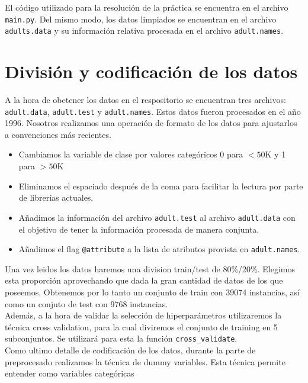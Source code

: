 \documentclass[11pt,a4paper]{article}
\begin{document}
El código utilizado para la resolución de la práctica se encuentra en el archivo \texttt{main.py}.  Del mismo modo, los datos limpiados se encuentran en el archivo \texttt{adults.data} y su información relativa procesada en el archivo \texttt{adult.names}.


\section{ División y codificación de los datos}

A la hora de obetener los datos en el respositorio se encuentran tres archivos: \texttt{adult.data},  \texttt{adult.test} y \texttt{adult.names}. Estos datos fueron procesados en el año 1996. Nosotros realizamos una operación de formato de los datos para ajustarlos a convenciones más recientes.

\begin{itemize}
\item Cambiamos la variable de clase por valores categóricos 0 para $<50$K y 1 para $>50$K
\item Eliminamos el espaciado después de la coma para facilitar la lectura por parte de librerías actuales.
\item Añadimos la información del archivo \texttt{adult.test} al archivo \texttt{adult.data} con el objetivo de tener la información procesada de manera conjunta.
\item Añadimos el flag \texttt{@attribute} a la lista de atributos provista en \texttt{adult.names}.
\end{itemize}

Una vez leidos los datos haremos una division train/test de 80\%/20\%. Elegimos esta proporción aprovechando que dada la gran cantidad de datos de los que poseemos. Obtenemos por lo tanto un conjunto de train con 39074 instancias, así como un conjuto de test con 9768 instancias.\\

Además, a la hora de validar la selección de hiperparámetros utilizaremos la técnica cross validation, para la cual diviremos el conjunto de training en 5 subconjuntos. Se utilizará para esta la función \texttt{cross\_validate}\cite{cv}.\\

Como ultimo detalle de codificación de los datos, durante la parte de preprocesado realizamos la técnica de dummy variables. Esta técnica permite entender como variables categóricas 
\end{document}

